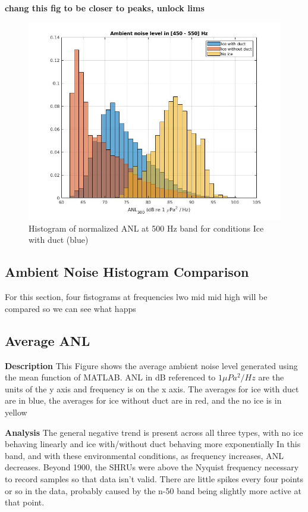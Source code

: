 \textbf{chang this fig to be closer to peaks, unlock lims}
\begin{figure}[h]
\centering
\includegraphics[scale=0.5]{Figures/ambient_hist_450_550.jpg}
\caption{Histogram of normalized ANL at 500 Hz band for conditions Ice with duct (blue) }
\label{fig_hist500}
\end{figure}

\subsection{Ambient Noise Histogram Comparison}
For this section, four fistograms at frequencies lwo mid mid high will be compared so we can see what happs


\subsection{Average ANL}
\textbf{Description}
This Figure shows the average ambient noise level generated using the mean function of MATLAB. ANL in dB referenced to $ 1 \mu Pa^{2}/Hz$ are the units of the y axis and frequency is on the x axis. The averages for ice with duct are in blue, the averages for ice without duct are in red, and the no ice is in yellow

\textbf{Analysis}
The general negative trend is present across all three types, with no ice behaving linearly and ice with/without duct behaving more exponentially
In this band, and with these environmental conditions, as frequency increases, ANL decreases. Beyond 1900, the SHRUs were above the Nyquist frequency necessary to record samples so that data isn’t valid. 
There are little spikes every four points or so in the data, probably caused by the n-50 band being slightly more active at that point.

